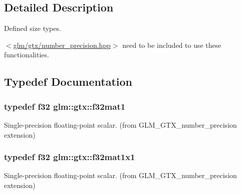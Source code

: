\subsection{Detailed Description}
Defined size types. 

$<$\hyperlink{number__precision_8hpp}{glm/gtx/number\+\_\+precision.\+hpp}$>$ need to be included to use these functionalities. 

\subsection{Typedef Documentation}
\hypertarget{group__gtx__number__precision_gae5ff376ec910c360f06acc0c2b99260c}{}
\subsubsection[{f32mat1}]{\setlength{\rightskip}{0pt plus 5cm}typedef f32 {\bf glm\+::gtx\+::f32mat1}}\label{group__gtx__number__precision_gae5ff376ec910c360f06acc0c2b99260c}


Single-\/precision floating-\/point scalar. (from G\+L\+M\+\_\+\+G\+T\+X\+\_\+number\+\_\+precision extension) 

\hypertarget{group__gtx__number__precision_ga01caec78388a82a9a22bd45e5751a38a}{}
\subsubsection[{f32mat1x1}]{\setlength{\rightskip}{0pt plus 5cm}typedef f32 {\bf glm\+::gtx\+::f32mat1x1}}\label{group__gtx__number__precision_ga01caec78388a82a9a22bd45e5751a38a}


Single-\/precision floating-\/point scalar. (from G\+L\+M\+\_\+\+G\+T\+X\+\_\+number\+\_\+precision extension) 

\hypertarget{group__gtx__number__precision_gadab8e598b0b4697629482682bdb7f223}{}
